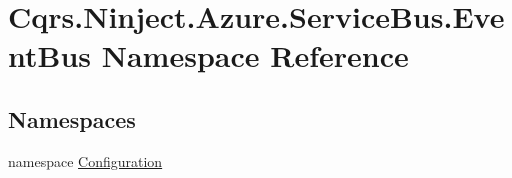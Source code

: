 \hypertarget{namespaceCqrs_1_1Ninject_1_1Azure_1_1ServiceBus_1_1EventBus}{}\section{Cqrs.\+Ninject.\+Azure.\+Service\+Bus.\+Event\+Bus Namespace Reference}
\label{namespaceCqrs_1_1Ninject_1_1Azure_1_1ServiceBus_1_1EventBus}
\subsection*{Namespaces}
\begin{DoxyCompactItemize}
\item 
namespace \hyperlink{namespaceCqrs_1_1Ninject_1_1Azure_1_1ServiceBus_1_1EventBus_1_1Configuration}{Configuration}
\end{DoxyCompactItemize}
